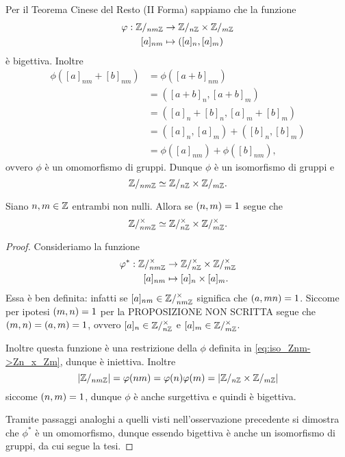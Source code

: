 \begin{remark}
    Per il Teorema Cinese del Resto (II Forma) sappiamo che la funzione 
    \begin{align} \label{eq:iso_Znm->Zn_x_Zm}
        \begin{split}
            \phi : \Zmod{nm} &\to \Zmod n \times \Zmod m\\
            [a]_{nm} &\mapsto ([a]_n, [a]_m)
        \end{split}
    \end{align} è bigettiva. Inoltre \begin{align*}
        \phi([a]_{nm} + [b]_{nm}) &= \phi([a+b]_{nm})\\
        &= ([a+b]_n, [a+b]_m)\\
        &= ([a]_n + [b]_n, [a]_m + [b]_m)\\
        &= ([a]_n, [a]_m) + ([b]_n, [b]_m)\\
        &= \phi([a]_{nm}) + \phi([b]_{nm}),
    \end{align*} ovvero $\phi$ è un omomorfismo di gruppi. Dunque $\phi$ è un isomorfismo di gruppi e \[
        \Zmod{nm} \isomorph \Zmod{n}\times \Zmod{m}.  
    \]
\end{remark}

\begin{corollary}
     Siano $n, m \in \Z$ entrambi non nulli. Allora se $\mcd{n}{m} = 1$ segue che \begin{equation}
        \invertible{\Zmod{nm}} \isomorph \invertible{\Zmod{n}} \times \invertible{\Zmod{m}}.
    \end{equation}
\end{corollary}
\begin{proof}
    Consideriamo la funzione \begin{align*}
        \phi^* : \invertible{\Zmod{nm}} &\to \invertible{\Zmod{n}} \times \invertible{\Zmod{m}}\\
        [a]_{nm} &\mapsto [a]_n \times [a]_m.
    \end{align*}
    Essa è ben definita: infatti se $[a]_{nm} \in \invertible{\Zmod{nm}}$ significa che $\mcd{a}{mn} = 1$. Siccome per ipotesi $\mcd{m}{n} = 1$ per la PROPOSIZIONE NON SCRITTA segue che $\mcd{m}{n} = \mcd{a}{m} = 1$, ovvero $[a]_n \in \invertible{\Zmod n}$ e $[a]_m \in \invertible{\Zmod m}$.

    Inoltre questa funzione è una restrizione della $\phi$ definita in \eqref{eq:iso_Znm->Zn_x_Zm}, dunque è iniettiva. Inoltre \[
        \abs*{\Zmod{nm}} = \phi(nm) = \phi(n)\phi(m) = \abs*{\Zmod{n} \times \Zmod{m}}    
    \] siccome $\mcd{n}{m} = 1$, dunque $\phi$ è anche surgettiva e quindi è bigettiva.

    Tramite passaggi analoghi a quelli visti nell'osservazione precedente si dimostra che $\phi^*$ è un omomorfismo, dunque essendo bigettiva è anche un isomorfismo di gruppi, da cui segue la tesi.
\end{proof}

